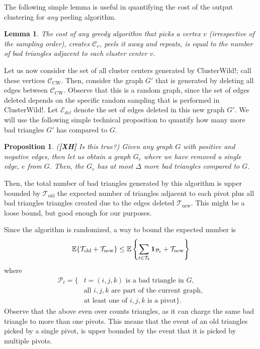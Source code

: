 \documentclass{article} %
\newtheorem{prop}{Proposition}
\newtheorem{lem}{Lemma}
\newcommand{\Tb}{\mathcal{T}_b}
\newcommand{\xh}[1]{{\color{red}({\bf [XH]} #1)}}
\begin{document}
The following simple lemma is useful in quantifying the cost of the output clustering for {\it any} peeling algorithm.

\begin{lem}
The cost of any greedy algorithm that picks a vertex $v$  (irrespective of the sampling order), creates $\mathcal{C}_v$, peels it away and repeats, is equal to the number of bad triangles adjacent to each cluster center $v$.
\end{lem}


Let us now consider the set of all cluster centers generated by ClusterWild!; call these vertices $\mathcal{C}_{\text{CW}}$.
Then, consider the graph $G'$ that is generated by deleting all edges between $\mathcal{C}_{\text{CW}}$.
Observe that this is a random graph, since the set of edges deleted depends on the specific random sampling that is performed in ClusterWild!.
Let $\mathcal{E}_{del}$ denote the set of edges deleted in this new graph $G'$.
We will use the following simple technical proposition to quantify how many more bad triangles $G'$ has compared to $G$.

\begin{prop}
\xh{Is this true?}
Given any graph $G$ with positive and negative edges, then let us obtain a graph $G_e$ where we have removed a single edge, $e$ from $G$.
Then, the $G_e$ has at most $\Delta$ more bad triangles compared to $G$.
\end{prop}


Then, the total number of bad triangles generated by this algorithm is upper bounded by $\mathcal{T}_{\text{old}}$ the expected number of triangles adjacent to each pivot plus all bad triangles triangles created due to the edges deleted $\mathcal{T}_{\text{new}}$.
This might be a loose bound, but good enough for our purposes.


Since the algorithm is randomized, a way to bound the expected number is
\begin{equation}
\mathbb{E}\{\mathcal{T}_{\text{old}}+\mathcal{T}_{\text{new}}\} \le \mathbb{E}\left\{\sum_{t\in\Tb} {\bf 1}_{\mathcal{P}_t}+\mathcal{T}_{\text{new}}\right\}
\end{equation}
where
\begin{align*}
\mathcal{P}_t = \{&\text{$t=(i,j,k)$ is a bad triangle in $G$}, \\
&\text{all $i,j,k$ are part of the current graph}, \\
&\text{at least one of $i,j,k$ is a pivot}\}.
\end{align*}
Observe that the above even over counts triangles, as it can charge the same bad triangle to more than one pivots.
This means that the event of an old triangles picked by a single pivot, is upper bounded by the event that it is picked by multiple pivots.
\end{document}
